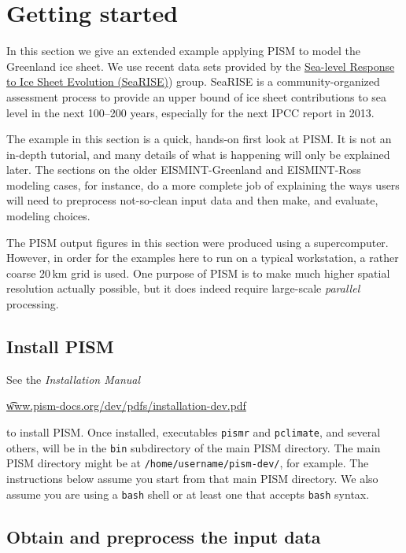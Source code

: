 
\section{Getting started}\label{sect:start}

In this section we give an extended example applying PISM to model the Greenland ice sheet.  We use recent data sets provided by the \href{http://websrv.cs.umt.edu/isis/index.php/SeaRISE_Assessment}{Sea-level Response to Ice Sheet Evolution (SeaRISE)}) group.  SeaRISE is a community-organized assessment process to provide an upper bound of ice sheet contributions to sea level in the next 100--200 years, especially for the next IPCC report in 2013.

The example in this section is a quick, hands-on first look at PISM.  It is not an in-depth tutorial, and many details of what is happening will only be explained later.  The sections on the older EISMINT-Greenland and EISMINT-Ross modeling cases, for instance, do a more complete job of explaining the ways users will need to preprocess not-so-clean input data and then make, and evaluate, modeling choices.

The PISM output figures in this section were produced using a supercomputer.  However, in order for the examples here to run on a typical workstation, a rather coarse $20\,\textrm{km}$ grid is used.  One purpose of PISM is to make much higher spatial resolution actually possible, but it does indeed require large-scale \emph{parallel} processing.


\subsection{Install PISM}

See the \emph{Installation Manual}
   \begin{center}
     \href{http://www.pism-docs.org/dev/pdfs/installation-dev.pdf}{\t{www.pism-docs.org/dev/pdfs/installation-dev.pdf}}
   \end{center}
to install PISM.  Once installed, executables \texttt{pismr} and \texttt{pclimate}, and several others, will be in the \texttt{bin} subdirectory of the main PISM directory.  The main PISM directory might be at \texttt{/home/username/pism-dev/}, for example.  The instructions below assume you start from that main PISM directory.  We also assume you are using a \texttt{bash} shell or at least one that accepts \texttt{bash} syntax.


\subsection{Obtain and preprocess the input data}

